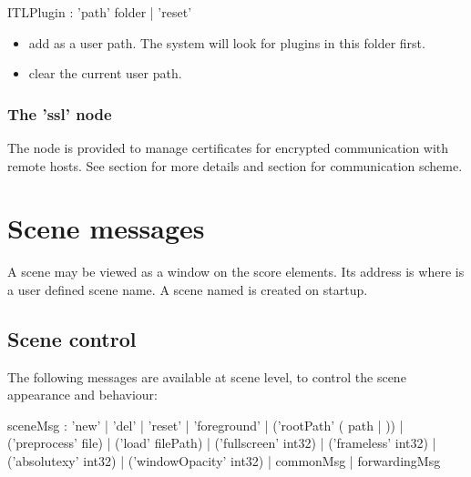 \documentclass[a4paper,twoside]{report}
\newcommand{\toplevel}[1]	{\chapter{#1}}
\newcommand{\sublevel}[1]	{\section{#1}}
\newcommand{\subsublevel}[1]	{\subsection{#1}}
\begin{document}
\begin{rail}
ITLPlugin : 'path'  folder
		| 'reset'
\end{rail}

\begin{itemize}
\item {} add  as a user path. The system will look for plugins in this folder first.
\item {} clear the current user path.
\end{itemize}

\subsublevel{The 'ssl' node}
\label{ITLSsl}

The  node is provided to manage certificates for encrypted communication with remote hosts. See section  for more details and section  for communication scheme.

\toplevel{Scene messages}
\label{scene}
A scene may be viewed as a window on the score elements. Its address is  where  is a user defined scene name. A scene named  is created on startup.

\sublevel{Scene control}
\label{scenecontrol}

The following messages are available at scene level, to control the scene appearance and behaviour:


\begin{rail}
sceneMsg :  'new'
			| 'del'
			| 'reset'
			| 'foreground'
			| ('rootPath' ( path | )) 
			| ('preprocess' file) 
			| ('load' filePath)
			| ('fullscreen' int32)
			| ('frameless' int32)
			| ('absolutexy' int32)
			| ('windowOpacity' int32)
			| commonMsg
			| forwardingMsg
\end{rail}
\end{document}
